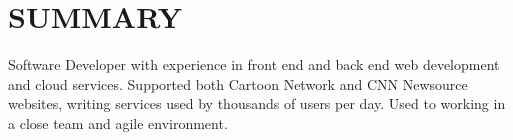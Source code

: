 \documentclass[]{deedy-resume-openfont}
\begin{document}
%
%

%
%



\vspace{5mm}

%
%

\section{SUMMARY}
\begin{flushleft}
Software Developer with experience in front end and back end web development and cloud services. Supported both Cartoon Network and CNN Newsource websites, writing services used by thousands of users per day. Used to working in a close team and agile environment.
\end{flushleft}
\vspace*{-3mm}
\end{document}
